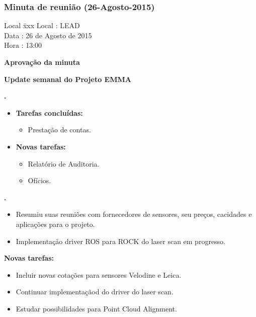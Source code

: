 \subsubsection{Minuta de reunião (26-Agosto-2015)}

\begin{tabbing}
  Local \= xxx \kill
  Local \> : LEAD \\
  Data  \> : 26 de Agosto de 2015 \\
  Hora  \> : 13:00
\end{tabbing}


\textbf{Aprovação da minuta}

\textbf{Update semanal do Projeto EMMA}
   							
\textbf{\alana.} 
	\begin{itemize}
		\item \textbf{Tarefas concluídas:}
			\begin{itemize}    
				\item Prestação de contas.
			\end{itemize}
		
		\item \textbf{Novas tarefas:}
			\begin{itemize} 
				\item Relatório de Auditoria.
				\item Ofícios.
			\end{itemize}
	\end{itemize}   		
						
\textbf{\gabriel.} 
	\begin{itemize}
			\item Resumiu suas reuniões com fornecedores de sensores, seu preços,
			cacidades e aplicações para o projeto.
			\item Implementação driver ROS para ROCK do laser scan em progresso.
			\end{itemize}
		
		\item \textbf{Novas tarefas:}
			\begin{itemize} 
				\item Incluir novas cotações para sensores Velodine e Leica.
				\item Continuar implementaçãod do driver do laser scan.
				\item Estudar possibilidades para Point Cloud Alignment.
			\end{itemize}

